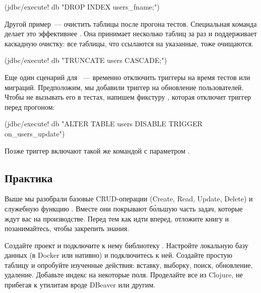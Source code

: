 \begin{english}
  \begin{clojure}
(jdbc/execute! db "DROP INDEX users_fname;")
  \end{clojure}
\end{english}


Другой пример~--- очистить таблицы после прогона тестов. Специальная команда  делает это эффективнее . Она принимает несколько таблиц за раз и поддерживает каскадную очистку: все таблицы, что ссылаются на указанные, тоже очищаются.

\begin{english}
  \begin{clojure}
(jdbc/execute! db "TRUNCATE users CASCADE;")
  \end{clojure}
\end{english}

Еще один сценарий для ~--- временно отключить триггеры на время тестов или миграций. Предположим, мы добавили триггер на обновление пользователей. Чтобы не вызывать его в тестах, напишем фикстуру , которая отключит триггер перед прогоном:

\begin{english}
  \begin{clojure}
(jdbc/execute! db
  "ALTER TABLE users DISABLE TRIGGER on_users_update")
  \end{clojure}
\end{english}

Позже триггер включают такой же командой с параметром .

\subsection{Практика}

Выше мы разобрали базовые CRUD-операции (Create, Read, Update, Delete) и служебную функцию . Вместе они покрывают б\'{о}льшую часть задач, которые ждут вас на производстве. Перед тем как идти вперед, отложите книгу и позанимайтесь, чтобы закрепить знания.

Создайте проект и подключите к нему библиотеку . Настройте локальную базу данных (в Docker или нативно) и подключитесь к ней. Создайте простую таблицу и опробуйте изученные действия: вставку, выборку, поиск, обновление, удаление. Добавьте индекс на некоторые поля. Проделайте все из Clojure, не прибегая к утилитам вроде DBeaver или другим.

